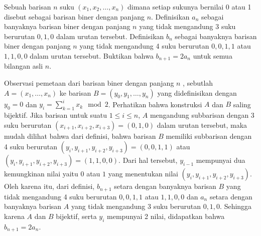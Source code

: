 \documentclass[12pt]{scrartcl}
\begin{document}
\begin{soaljawab}
    Sebuah barisan $n$ suku $(x_1,x_2,\dots,x_n)$ dimana setiap sukunya bernilai 0 atau 1 disebut sebagai barisan biner dengan panjang $n$. Definisikan $a_n$ sebagai banyaknya barisan biner dengan panjang $n$ yang tidak mengandung 3 suku berurutan $0,1,0$ dalam urutan tersebut. Definisikan $b_n$ sebagai banyaknya barisan biner dengan panjang $n$ yang tidak mengandung 4 suku berurutan $0,0,1,1$ atau $1,1,0,0$  dalam urutan tersebut. Buktikan bahwa $b_{n+1} = 2a_{n}$ untuk semua bilangan asli $n$.
    \begin{solusi}
        Observasi pemetaan dari barisan biner dengan panjang $n$ , sebutlah $A=(x_1, \dots, x_n)$ ke barisan $B=(y_0,y_1,\dots,y_n)$ yang didefinisikan dengan $y_0 = 0$ dan $y_i = \sum_{k=1}^{i} x_k \mod 2$. Perhatikan bahwa konstruksi $A$ dan $B$ saling bijektif. Jika barisan untuk suatu $1 \le i \le n$, $A$ mengandung subbarisan dengan 3 suku berurutan $(x_{i+1}, x_{i+2}, x_{i+3})=(0,1,0)$ dalam urutan tersebut, maka mudah dilihat bahwa dari definisi, bahwa barisan $B$ memiliki subbarisan dengan 4 suku berurutan $(y_i, y_{i+1}, y_{i+2}, y_{i+3})=(0,0,1,1)$ atau $(y_i, y_{i+1}, y_{i+2}, y_{i+3})=(1,1,0,0)$. Dari hal tersebut, $y_{i-1}$ mempunyai dua kemungkinan nilai yaitu $0$ atau $1$ yang menentukan nilai $(y_i, y_{i+1}, y_{i+2}, y_{i+3})$. Oleh karena itu, dari definisi, $b_{n+1}$ setara dengan banyaknya barisan $B$ yang tidak mengandung 4 suku berurutan $0,0,1,1$ atau $1,1,0,0$ dan $a_n$ setara dengan banyaknya barisan $A$ yang tidak mengandung 3 suku berurutan $0,1,0$. Sehingga karena $A$ dan $B$ bijektif, serta $y_i$ mempunyai 2 nilai, didapatkan bahwa $b_{n+1}=2a_n$.
    \end{solusi}
\end{soaljawab}
\end{document}
